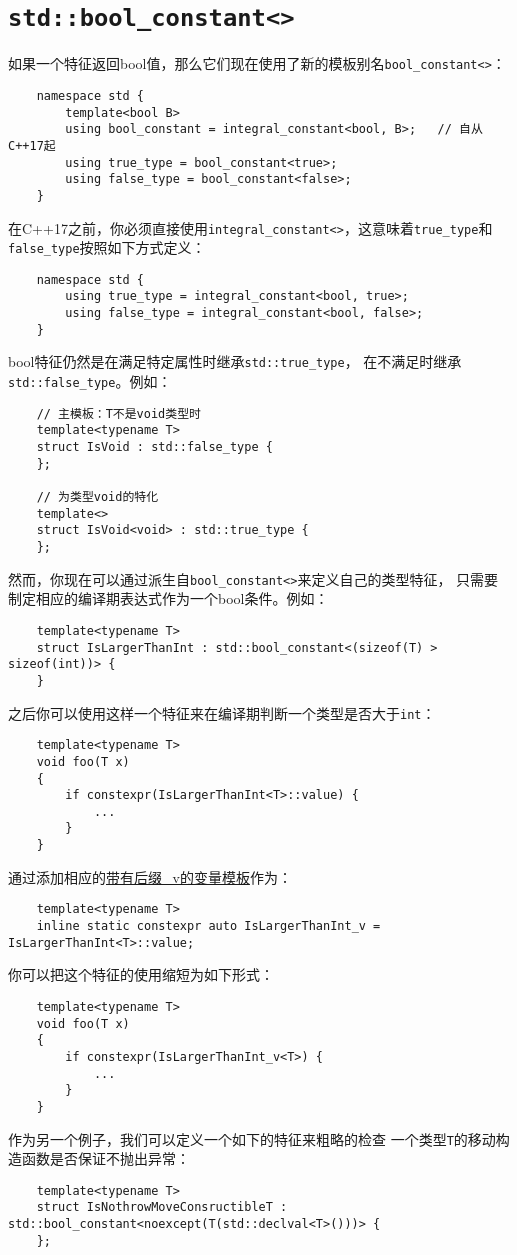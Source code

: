 \section{\texttt{std::bool\_constant<>}}\label{ch33.2}
如果一个特征返回bool值，那么它们现在使用了新的模板别名\texttt{bool\_constant<>}：
\begin{lstlisting}
    namespace std {
        template<bool B>
        using bool_constant = integral_constant<bool, B>;   // 自从C++17起
        using true_type = bool_constant<true>;
        using false_type = bool_constant<false>;
    }
\end{lstlisting}
在C++17之前，你必须直接使用\texttt{integral\_constant<>}，这意味着\texttt{true\_type}和
\texttt{false\_type}按照如下方式定义：
\begin{lstlisting}
    namespace std {
        using true_type = integral_constant<bool, true>;
        using false_type = integral_constant<bool, false>;
    }
\end{lstlisting}
bool特征仍然是在满足特定属性时继承\texttt{std::true\_type}，
在不满足时继承\texttt{std::false\_type}。例如：
\begin{lstlisting}
    // 主模板：T不是void类型时
    template<typename T>
    struct IsVoid : std::false_type {
    };

    // 为类型void的特化
    template<>
    struct IsVoid<void> : std::true_type {
    };
\end{lstlisting}
然而，你现在可以通过派生自\texttt{bool\_constant<>}来定义自己的类型特征，
只需要制定相应的编译期表达式作为一个bool条件。例如：
\begin{lstlisting}
    template<typename T>
    struct IsLargerThanInt : std::bool_constant<(sizeof(T) > sizeof(int))> {
    }
\end{lstlisting}
之后你可以使用这样一个特征来在编译期判断一个类型是否大于\texttt{int}：
\begin{lstlisting}
    template<typename T>
    void foo(T x)
    {
        if constexpr(IsLargerThanInt<T>::value) {
            ...
        }
    }
\end{lstlisting}
通过添加相应的\hyperref[ch21.1]{带有后缀\_v的变量模板}作为：
\begin{lstlisting}
    template<typename T>
    inline static constexpr auto IsLargerThanInt_v = IsLargerThanInt<T>::value;
\end{lstlisting}
你可以把这个特征的使用缩短为如下形式：
\begin{lstlisting}
    template<typename T>
    void foo(T x)
    {
        if constexpr(IsLargerThanInt_v<T>) {
            ...
        }
    }
\end{lstlisting}
作为另一个例子，我们可以定义一个如下的特征来粗略的检查
一个类型\texttt{T}的移动构造函数是否保证不抛出异常：
\begin{lstlisting}
    template<typename T>
    struct IsNothrowMoveConsructibleT : std::bool_constant<noexcept(T(std::declval<T>()))> {
    };
\end{lstlisting}


